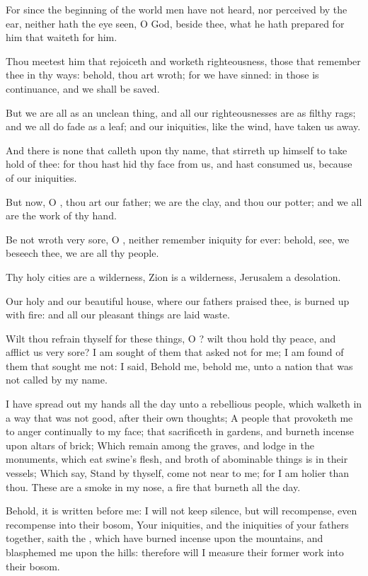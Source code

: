 \Verse For since the beginning of the world men have not heard, nor perceived by the ear, neither hath the eye seen, O God, beside thee, what he hath prepared for him that waiteth for him.

\Verse Thou meetest him that rejoiceth and worketh righteousness, those that remember thee in thy ways: behold, thou art wroth; for we have sinned: in those is continuance, and we shall be saved.

\Verse But we are all as an unclean thing, and all our righteousnesses are as filthy rags; and we all do fade as a leaf; and our iniquities, like the wind, have taken us away.

\Verse And there is none that calleth upon thy name, that stirreth up himself to take hold of thee: for thou hast hid thy face from us, and hast consumed us, because of our iniquities.

\Verse But now, O \LORD, thou art our father; we are the clay, and thou our potter; and we all are the work of thy hand.

\Verse Be not wroth very sore, O \LORD, neither remember iniquity for ever: behold, see, we beseech thee, we are all thy people.

\Verse Thy holy cities are a wilderness, Zion is a wilderness, Jerusalem a desolation.

\Verse Our holy and our beautiful house, where our fathers praised thee, is burned up with fire: and all our pleasant things are laid waste.

\Verse Wilt thou refrain thyself for these things, O \LORD? wilt thou hold thy peace, and afflict us very sore?  
\Chapter
\Verse I am sought of them that asked not for me; I am found of them that sought me not: I said, Behold me, behold me, unto a nation that was not called by my name.

\Verse I have spread out my hands all the day unto a rebellious people, which walketh in a way that was not good, after their own thoughts; \Verse A people that provoketh me to anger continually to my face; that sacrificeth in gardens, and burneth incense upon altars of brick; \Verse Which remain among the graves, and lodge in the monuments, which eat swine's flesh, and broth of abominable things is in their vessels; \Verse Which say, Stand by thyself, come not near to me; for I am holier than thou. These are a smoke in my nose, a fire that burneth all the day.

\Verse Behold, it is written before me: I will not keep silence, but will recompense, even recompense into their bosom, \Verse Your iniquities, and the iniquities of your fathers together, saith the \LORD, which have burned incense upon the mountains, and blasphemed me upon the hills: therefore will I measure their former work into their bosom.

